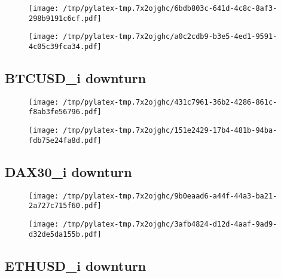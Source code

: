 \documentclass{article}%
\begin{document}
\begin{figure}[htbp]%
\centering%
\texttt{[image: /tmp/pylatex-tmp.7x2ojghc/6bdb803c-641d-4c8c-8af3-298b9191c6cf.pdf]}%
\end{figure}

%


\begin{figure}[htbp]%
\centering%
\texttt{[image: /tmp/pylatex-tmp.7x2ojghc/a0c2cdb9-b3e5-4ed1-9591-4c05c39fca34.pdf]}%
\end{figure}

%
\newpage %
\subsection{BTCUSD\_i downturn}%
\label{subsec:BTCUSDidownturn}%


\begin{figure}[htbp]%
\centering%
\texttt{[image: /tmp/pylatex-tmp.7x2ojghc/431c7961-36b2-4286-861c-f8ab3fe56796.pdf]}%
\end{figure}

%


\begin{figure}[htbp]%
\centering%
\texttt{[image: /tmp/pylatex-tmp.7x2ojghc/151e2429-17b4-481b-94ba-fdb75e24fa8d.pdf]}%
\end{figure}

%
\newpage %
\subsection{DAX30\_i downturn}%
\label{subsec:DAX30idownturn}%


\begin{figure}[htbp]%
\centering%
\texttt{[image: /tmp/pylatex-tmp.7x2ojghc/9b0eaad6-a44f-44a3-ba21-2a727c715f60.pdf]}%
\end{figure}

%


\begin{figure}[htbp]%
\centering%
\texttt{[image: /tmp/pylatex-tmp.7x2ojghc/3afb4824-d12d-4aaf-9ad9-d32de5da155b.pdf]}%
\end{figure}

%
\newpage %
\subsection{ETHUSD\_i downturn}%
\label{subsec:ETHUSDidownturn}%
\end{document}
